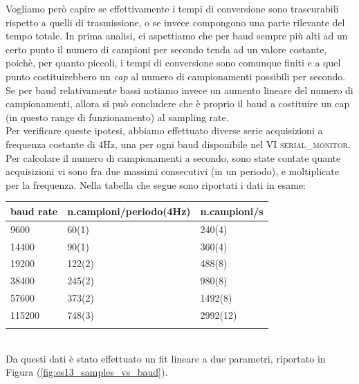 \documentclass[journal, a4paper]{IEEEtran}
\begin{document}
Vogliamo però capire se effettivamente i tempi di conversione sono trascurabili rispetto a quelli di trasmissione, o se invece compongono una parte rilevante del tempo totale. In prima analisi, ci aspettiamo che per baud sempre più alti ad un certo punto il numero di campioni per secondo tenda ad un valore costante, poichè, per quanto piccoli, i tempi di conversione sono comunque finiti e a quel punto costituirebbero un \textit{cap} al numero di campionamenti possibili per secondo. Se per baud relativamente bassi notiamo invece un aumento lineare del numero di campionamenti, allora si può concludere che è proprio il baud a costituire un cap (in questo range di funzionamento) al sampling rate. \\ Per verificare queste ipotesi, abbiamo effettuato diverse serie acquisizioni a frequenza costante di 4Hz, una per ogni baud disponibile nel VI \textsc{serial\_monitor}. Per calcolare il numero di campionamenti a secondo, sono state contate quante acquisizioni vi sono fra due massimi consecutivi (in un periodo), e moltiplicate per la frequenza. Nella tabella che segue sono riportati i dati in esame:\\


\begin{table}
\centering
\begin{tabular}{l|l|l}
\hline
\textbf{baud rate} & \textbf{ n.campioni/periodo}(4Hz) & \textbf{n.campioni/s} \\
\hline
9600 & 60(1) & 240(4)\\
14400 & 90(1) & 360(4)\\
19200 & 122(2) & 488(8)\\
38400 & 245(2) & 980(8)\\
57600 & 373(2) & 1492(8)\\
115200 & 748(3) & 2992(12)\\
\hline& 
\end{tabular}
\end{table}
~\\

Da questi dati è stato effettuato un fit lineare a due parametri, riportato in Figura (\ref{fig:es13_samples_vs_baud}).
\end{document}
